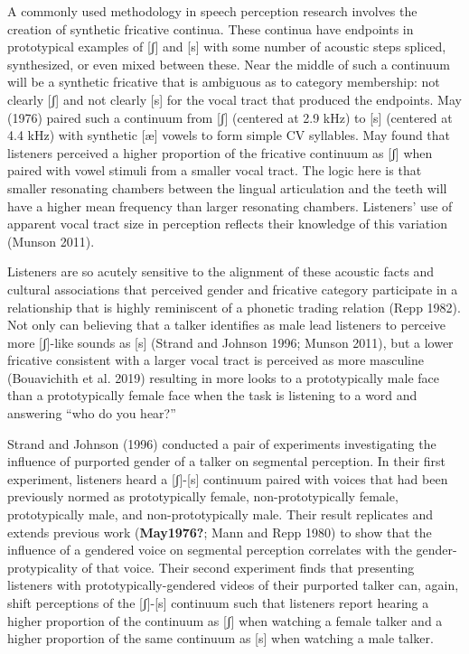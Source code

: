\documentclass[
  letterpaper,
  DIV=11,
  numbers=noendperiod]{scrartcl}
\begin{document}
A commonly used methodology in speech perception research involves the
creation of synthetic fricative continua. These continua have endpoints
in prototypical examples of {[}ʃ{]} and {[}s{]} with some number of
acoustic steps spliced, synthesized, or even mixed between these. Near
the middle of such a continuum will be a synthetic fricative that is
ambiguous as to category membership: not clearly {[}ʃ{]} and not clearly
{[}s{]} for the vocal tract that produced the endpoints. May (1976)
paired such a continuum from {[}ʃ{]} (centered at 2.9 kHz) to {[}s{]}
(centered at 4.4 kHz) with synthetic {[}æ{]} vowels to form simple CV
syllables. May found that listeners perceived a higher proportion of the
fricative continuum as {[}ʃ{]} when paired with vowel stimuli from a
smaller vocal tract. The logic here is that smaller resonating chambers
between the lingual articulation and the teeth will have a higher mean
frequency than larger resonating chambers. Listeners' use of apparent
vocal tract size in perception reflects their knowledge of this
variation (Munson 2011).

Listeners are so acutely sensitive to the alignment of these acoustic
facts and cultural associations that perceived gender and fricative
category participate in a relationship that is highly reminiscent of a
phonetic trading relation (Repp 1982). Not only can believing that a
talker identifies as male lead listeners to perceive more {[}ʃ{]}-like
sounds as {[}s{]} (Strand and Johnson 1996; Munson 2011), but a lower
fricative consistent with a larger vocal tract is perceived as more
masculine (Bouavichith et al. 2019) resulting in more looks to a
prototypically male face than a prototypically female face when the task
is listening to a word and answering ``who do you hear?''

Strand and Johnson (1996) conducted a pair of experiments investigating
the influence of purported gender of a talker on segmental perception.
In their first experiment, listeners heard a {[}ʃ{]}-{[}s{]} continuum
paired with voices that had been previously normed as prototypically
female, non-prototypically female, prototypically male, and
non-prototypically male. Their result replicates and extends previous
work (\textbf{May1976?}; Mann and Repp 1980) to show that the influence
of a gendered voice on segmental perception correlates with the
gender-protypicality of that voice. Their second experiment finds that
presenting listeners with prototypically-gendered videos of their
purported talker can, again, shift perceptions of the {[}ʃ{]}-{[}s{]}
continuum such that listeners report hearing a higher proportion of the
continuum as {[}ʃ{]} when watching a female talker and a higher
proportion of the same continuum as {[}s{]} when watching a male talker.
\end{document}
